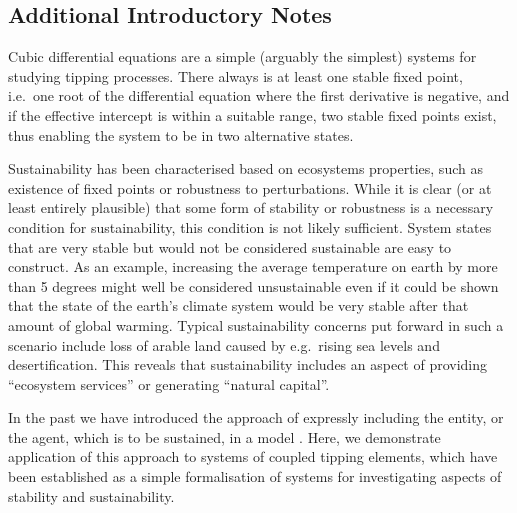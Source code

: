 \documentclass[letterpaper]{article}
\begin{document}



\subsection{Additional Introductory Notes}

Cubic differential equations are a simple (arguably the simplest)
systems for studying tipping processes. There always is at least one
stable fixed point, i.e.\ one root of the differential equation where
the first derivative is negative, and if the effective intercept is
within a suitable range, two stable fixed points exist, thus enabling
the system to be in two alternative states.

Sustainability has been characterised based on ecosystems properties,
such as existence of fixed points or robustness to perturbations.
While it is clear (or at least entirely plausible) that some form of
stability or robustness is a necessary condition for sustainability,
this condition is not likely sufficient. System states that are very
stable but would not be considered sustainable are easy to construct.
As an example, increasing the average temperature on earth by more
than 5 degrees might well be considered unsustainable even if it could
be shown that the state of the earth's climate system would be very
stable after that amount of global warming. Typical sustainability
concerns put forward in such a scenario include loss of arable land
caused by e.g.\ rising sea levels and desertification. This reveals
that sustainability includes an aspect of providing ``ecosystem
services'' or generating ``natural capital''.

In the past we have introduced the approach of expressly including the
entity, or the agent, which is to be sustained, in a model
\citep{Kim2009_sustainability}. Here, we demonstrate application of
this approach to systems of coupled tipping elements, which have been
established as a simple formalisation of systems for investigating
aspects of stability and sustainability.
\end{document}
